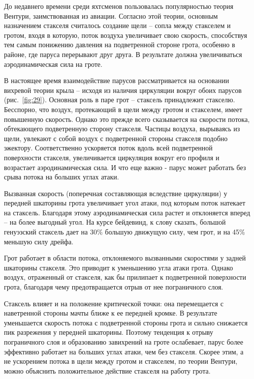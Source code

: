 \documentclass[a4paper, 12pt, twoside, final, book, russian, fittopage, cyremdash]{ncc}
\newcommand{\ris}[1]{\ref{fig:#1}}
\begin{document}
До недавнего времени среди яхтсменов пользовалась популярностью теория Вентури, заимствованная из авиации. Согласно этой теории, основным назначением стакселя считалось создание щели \--- сопла между стакселем и гротом, входя в которую, поток воздуха увеличивает свою скорость, способствуя тем самым понижению давления на подветренной стороне грота, особенно в районе, где паруса перерывают друг друга. В результате должна увеличиваться аэродинамическая сила на гроте.

В настоящее время взаимодействие парусов рассматривается на основании вихревой теории крыла \--- исходя из наличия циркуляции вокруг обоих парусов (рис.~\ris{29}). Основная роль в паре грот \--- стаксель принадлежит стакселю. Бесспорно, что воздух, протекающий в щели между гротом и стакселем, имеет повышенную скорость. Однако это прежде всего сказывается на скорости потока, обтекающего подветренную сторону стакселя. Частицы воздуха, вырываясь из щели, увлекают с собой воздух с подветренной стороны стакселя подобно эжектору. Соответственно ускоряется поток вдоль всей подветренной поверхности стакселя, увеличивается циркуляция вокруг его профиля и возрастает аэродинамическая сила. И что еще важно - парус может работать без срыва потока на больших углах атаки.
 
Вызванная скорость (поперечная составляющая вследствие циркуляции) у передней шкаторины грота увеличивает угол атаки, под которым поток натекает на стаксель. Благодаря этому аэродинамическая сила растет и отклоняется вперед \--- на более выгодный угол. На курсе бейдевинд, к слову сказать, большой генуэзский стаксель дает на 30\% большую движущую силу, чем грот, и на 45\% меньшую силу дрейфа.
 
Грот работает в области потока, отклоняемого вызванными скоростями у задней шкаторины стакселя. Это приводит к уменьшению угла атаки грота. Однако воздух, отраженный от стакселя, как бы прилипает к подветренной поверхности грота, благодаря чему предотвращается отрыв от нее пограничного слоя.

Стаксель влияет и на положение критической точки: она перемещается с наветренной стороны мачты ближе к ее передней кромке. В результате уменьшается скорость потока с подветренной стороны грота и сильно снижается пик разрежения у передней шкаторины. Поэтому тенденция к отрыву пограничного слоя и образованию завихрений на гроте ослабевает, парус более эффективно работает на больших углах атаки, чем без стакселя. Скорее этим, а не ускорением потока в щели между гротом и стакселем, по теории Вентури, можно объяснить положительное действие стакселя на работу грота.
\end{document}
